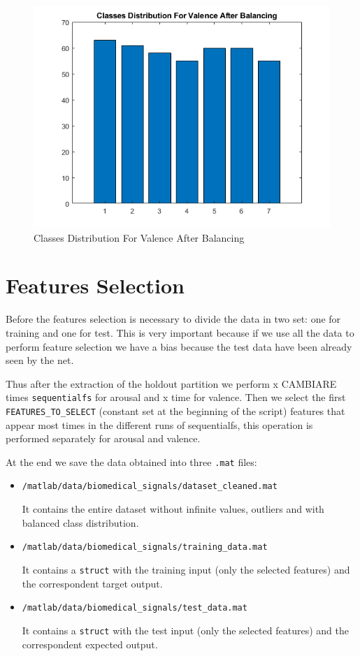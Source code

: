 \documentclass[a4paper]{report}
\begin{document}
		\begin{figure}[htbp]
		\centering
		\includegraphics[scale=0.7]{img/afterBalancingValence.png}
		\caption{Classes Distribution For Valence After Balancing}
		\label{afterBalancingValence}
	\end{figure}
	
	\section{Features Selection}
	\noindent Before the features selection is necessary to divide the data in two set: one for training and one for test. This is very important because if we use all the data to perform feature selection we have a bias because the test data have been already seen by the net.
	
	\noindent Thus after the extraction of the holdout partition we perform x CAMBIARE times \texttt{sequentialfs} for arousal and x time for valence. Then we select the first \texttt{FEATURES\_TO\_SELECT} (constant set at the beginning of the script) features that appear most times in the different runs of sequentialfs, this operation is performed separately for arousal and valence.
	
	\noindent At the end we save the data obtained into three \texttt{.mat} files:
	\begin{itemize}
		\item \texttt{/matlab/data/biomedical\_signals/dataset\_cleaned.mat}
		
		\noindent It contains the entire dataset without infinite values, outliers and with balanced class distribution.
		\item \texttt{/matlab/data/biomedical\_signals/training\_data.mat}
		
		\noindent It contains a \texttt{struct} with the training input (only the selected features) and the correspondent target output.
		
		\item \texttt{/matlab/data/biomedical\_signals/test\_data.mat}
		
		\noindent It contains a \texttt{struct} with the test input (only the selected features) and the correspondent expected output.
	\end{itemize}
	
\end{document}
